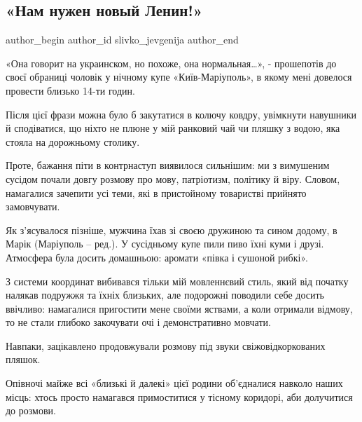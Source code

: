  
 
 
 
 
\subsection{«Нам нужен новый Ленин!»}
\label{sec:15_12_2021.stz.news.ua.den.1.nuzhen_lenin}


\ifcmt
 author_begin
   author_id slivko_jevgenija
 author_end
\fi

«Она говорит на украинском, но похоже, она  нормальная…», - прошепотів до своєї
обраниці чоловік у нічному купе «Київ-Маріуполь», в якому мені довелося
провести близько 14-ти годин.

Після цієї фрази можна було б закутатися в колючу ковдру, увімкнути навушники й
сподіватися, що ніхто не плюне у мій ранковий чай чи пляшку з водою, яка стояла
на дорожньому столику.

Проте, бажання піти в контрнаступ виявилося сильнішим: ми з вимушеним сусідом
почали довгу розмову про мову, патріотизм, політику й віру. Словом, намагалися
зачепити усі теми, які в пристойному товаристві прийнято замовчувати.

Як з'ясувалося пізніше, мужчина їхав зі своєю дружиною та сином додому, в Марік
(Маріуполь – ред.). У сусідньому купе пили пиво їхні куми і друзі. Атмосфера
була досить домашньою: аромати «півка і сушоной рибкі».

З системи координат вибивався тільки мій мовленнєвий стиль, який від початку
налякав подружжя та їхніх близьких, але подорожні поводили себе досить
ввічливо: намагалися пригостити мене своїми яствами, а коли отримали відмову,
то не стали глибоко закочувати очі і демонстративно мовчати.

Навпаки, зацікавлено продовжували розмову під звуки свіжовідкоркованих пляшок.

Опівночі  майже всі «близькі й далекі» цієї родини об'єдналися навколо наших
місць: хтось просто намагався примоститися у тісному коридорі, аби долучитися
до розмови.

